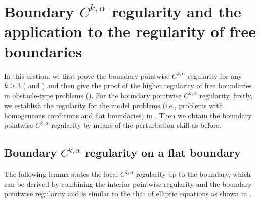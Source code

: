 \documentclass[preprint,12pt]{elsarticle}
\theoremstyle{definition}
\theoremstyle{remark}
\numberwithin{equation}{section}
\begin{document}
%

\section{Boundary $C^{k,\alpha}$ regularity and the application to the regularity of free boundaries }\label{Sec:Cka_freeb}
In this section, we first prove the boundary pointwise $C^{k,\alpha}$ regularity for any $k\geq 3$ ( and ) and then give the proof of the higher regularity of free boundaries in obstacle-type problems (). For the boundary pointwise $C^{k,\alpha}$ regularity, firstly, we establish the regularity for the model problems (i.e., problems with homogeneous conditions and flat boundaries) in . Then we obtain the boundary pointwise $C^{k,\alpha}$ regularity by means of the perturbation skill as before.

\subsection{Boundary $C^{k, \alpha}$ regularity on a flat boundary}\label{subsec:Cka.flat}

The following lemma states the local $C^{2,\alpha}$ regularity up to the boundary, which can be derived by combining the interior pointwise regularity and the boundary pointwise regularity and is similar to the that of elliptic equations as shown in \cite[Lemma 9.1]{lian2020pointwise}.
\end{document}
